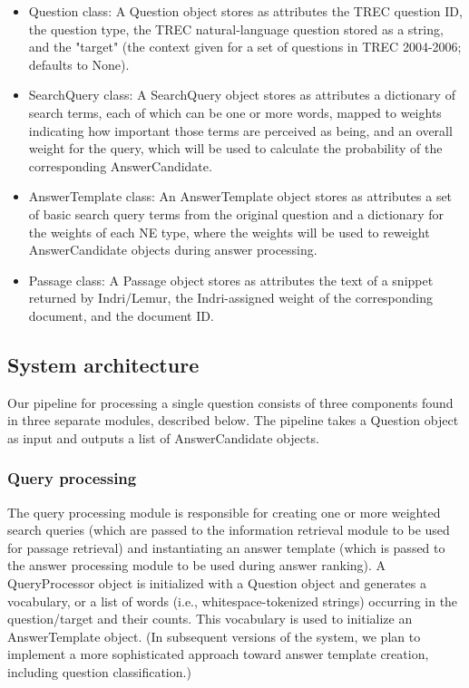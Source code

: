 \documentclass[11pt]{article}
\begin{document}
\begin{itemize}
\item Question class: A Question object stores as attributes the TREC question ID, the question type, the TREC natural-language question stored as a string, and the "target" (the context given for a set of questions in TREC 2004-2006; defaults to None).
\item SearchQuery class: A SearchQuery object stores as attributes a dictionary of search terms, each of which can be one or more words, mapped to weights indicating how important those terms are perceived as being, and an overall weight for the query, which will be used to calculate the probability of the corresponding AnswerCandidate.
\item AnswerTemplate class: An AnswerTemplate object stores as attributes a set of basic search query terms from the original question and a dictionary for the weights of each NE type, where the weights will be used to reweight AnswerCandidate objects during answer processing.
\item Passage class: A Passage object stores as attributes the text of a snippet returned by Indri/Lemur, the Indri-assigned weight of the corresponding document, and the document ID.
\end{itemize}

\subsection{System architecture}

Our pipeline for processing a single question consists of three components found in three separate modules, described below. The pipeline takes a Question object as input and outputs a list of AnswerCandidate objects.

\subsubsection{Query processing}

The query processing module is responsible for creating one or more weighted search queries (which are passed to the information retrieval module to be used for passage retrieval) and instantiating an answer template (which is passed to the answer processing module to be used during answer ranking). A QueryProcessor object is initialized with a Question object and generates a vocabulary, or a list of words (i.e., whitespace-tokenized strings) occurring in the question/target and their counts. This vocabulary is used to initialize an AnswerTemplate object. (In subsequent versions of the system, we plan to implement a more sophisticated approach toward answer template creation, including question classification.)
\end{document}
